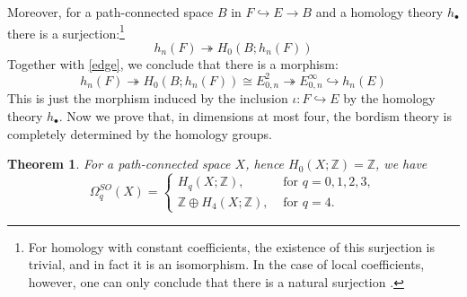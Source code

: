 \documentclass[a4paper,11pt]{article}
\newtheorem{theorem}{Theorem}[section]
\theoremstyle{definition}
\theoremstyle{remark}
\begin{document}
Moreover, for a path-connected space $B$ in $F\hookrightarrow E\to B$ and a homology theory $h_\bullet$ there is a surjection:\footnote{For homology with constant coefficients, the existence of this surjection is trivial, and in fact it is an isomorphism. In the case of local coefficients, however, one can only conclude that there is a natural surjection \cite[Proposition 5.14]{davis2001lecture}.}
\[
	h_n(F)\twoheadrightarrow H_0(B;h_n(F))
\]
Together with \eqref{edge}, we conclude that there is a morphism:
\begin{equation}
	\label{edge2}
h_n(F)\twoheadrightarrow H_0(B;h_n(F))\cong E_{0,n}^2\twoheadrightarrow E_{0,n}^\infty\hookrightarrow h_n(E)
\end{equation}
This is just the morphism induced by the inclusion $\iota : F\hookrightarrow E$ by the homology theory $h_\bullet$. Now we prove that, in dimensions at most four, the bordism theory is completely determined by the homology groups.
\begin{theorem}
	For a path-connected space $X$, hence $H_0(X;\mathbb{Z})=\mathbb{Z}$, we have
	\begin{equation}
		\Omega_q^{SO}(X)=\begin{cases}
			H_q(X;\mathbb{Z}),&\text{~for~}q=0,1,2,3,\\\mathbb{Z}\oplus H_4(X;\mathbb{Z}),&\text{~for~}q=4.\end{cases}
	\end{equation}
\end{theorem}
\end{document}
